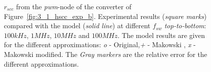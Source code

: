 \begin{figure}[!h]
\centering
    \begin{subfigure}{\textwidth}
        \parbox[c]{.03\linewidth}{\subcaption{}\label{fig:exp_rscc_pwm_node_100kHz}}
        \hspace{.02\linewidth}
        \parbox[c]{.95\linewidth}{
        \centering
        }
    \end{subfigure}

    \begin{subfigure}{\textwidth}
        \parbox[c]{.03\linewidth}{\subcaption{}\label{fig:exp_rscc_pwm_node_1MHz}}
        \hspace{.02\linewidth}
        \parbox[c]{.95\linewidth}{
        \centering
        }
    \end{subfigure}

    \begin{subfigure}{\textwidth}
        \parbox[c]{.03\linewidth}{\subcaption{}\label{fig:exp_rscc_pwm_node_10MHz}}
        \hspace{.02\linewidth}
        \parbox[c]{.95\linewidth}{
        \centering
        }
    \end{subfigure}

    \begin{subfigure}{\textwidth}
        \parbox[c]{.03\linewidth}{\subcaption{}\label{fig:exp_rscc_pwm_node_100MHz}}
        \hspace{.02\linewidth}
        \parbox[c]{.95\linewidth}{
        \centering
        }
    \end{subfigure}

\caption{$r_{scc}$ from the \emph{pwm}-node of the converter of Figure~\ref{fig:3_1_hscc_exp_b}. Experimental results (\emph{square marks}) compared with the model (\emph{solid line}) at different $f_{sw}$ \emph{top-to-bottom}: $100kHz$, $1MHz$, $10MHz$ and $100MHz$. The model results are given for the different approximations: \emph{o} - Original,\emph{+} - Makowski , \emph{x} - Makowski modified. The \emph{Gray markers} are the relative error for the different approximations.  }
\label{fig:exp_rscc_pwm_node_dx}
\end{figure}

